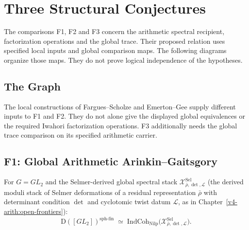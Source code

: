 \chapter{Three Structural Conjectures}
\label{v4-arith:app:three-conjectures-dep}

The comparisons F1, F2 and F3 concern the arithmetic spectral
recipient, factorization operations and the global trace.
Their proposed relation uses specified local inputs and global
comparison maps. The following diagrams organize those maps.
They do not prove logical independence of the hypotheses.

\section{The Graph}
\label{v4-arith:app:C:graph}

\begin{center}
\end{center}

The local constructions of Fargues--Scholze and Emerton--Gee
supply different inputs to F1 and F2.
They do not alone give the displayed global equivalences or
the required Iwahori factorization operations.
F3 additionally needs the global trace comparison on its
specified arithmetic carrier.

\section{F1: Global Arithmetic Arinkin--Gaitsgory}
\label{v4-arith:app:C:F1-details}

\begin{conjecture}[restatement of F1]
\label{v4-arith:app:C:F1-restatement}
For \(G=GL_{2}\) and the Selmer-derived global spectral stack
\(\mathcal{X}^{\mathrm{Sel}}_{\bar\rho,\det,\mathcal{L}}\) (the
derived moduli stack of Selmer deformations of a residual
representation \(\bar\rho\) with determinant condition \(\det\) and
cyclotomic twist datum \(\mathcal{L}\), as in
Chapter~\ref{v4-arith:open-frontiers}):
\begin{equation}
\mathrm{D}([GL_{2}])^{\mathrm{sph\text{-}fin}}\;\simeq\;\mathrm{IndCoh}_{\mathrm{Nilp}}\bigl(\mathcal{X}^{\mathrm{Sel}}_{\bar\rho,\det,\mathcal{L}}\bigr).
\end{equation}
\end{conjecture}


